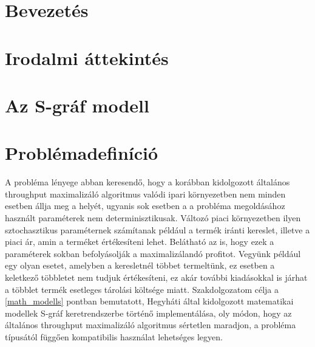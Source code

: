 \documentclass [12pt]{report}
\begin{document}

\tableofcontents
\thispagestyle{empty}

\chapter{Bevezetés}
\setcounter{page}{1}
\chapter{Irodalmi áttekintés}
\chapter{Az S-gráf modell}
\chapter{Problémadefiníció}
A probléma lényege abban keresendő, hogy a korábban kidolgozott általános throughput maximalizáló algoritmus \cite{?} valódi ipari környezetben nem minden esetben állja meg a helyét, ugyanis sok esetben a a probléma megoldásához használt paraméterek nem determinisztikusak. Változó piaci környezetben ilyen sztochasztikus paraméternek számítanak például a termék iránti kereslet, illetve a piaci ár, amin a terméket értékesíteni lehet. Belátható az is, hogy ezek a paraméterek sokban befolyásolják a maximalizálandó profitot. Vegyünk például egy olyan esetet, amelyben a keresletnél többet termeltünk, ez esetben a keletkező többletet nem tudjuk értékesíteni, ez akár további kiadásokkal is járhat a többlet termék esetleges tárolási költsége miatt. Szakdolgozatom célja a \ref{math_modells} pontban bemutatott, Hegyháti által kidolgozott \cite{?} matematikai modellek S-gráf keretrendszerbe történő implementálása, oly módon, hogy az általános throughput maximalizáló algoritmus sértetlen maradjon, a probléma típusától függően kompatibilis használat lehetséges legyen.
\end{document}
